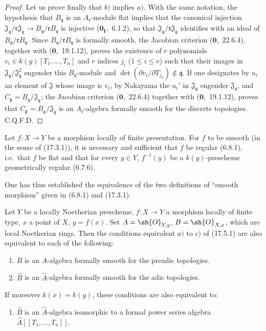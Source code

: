 \begin{proof}
Let us prove finally that $b)$ implies $a)$.
With the same notation, the hypothesis that $B_\mathfrak{q}$ is an $A_\mathfrak{r}$-module flat implies that the canonical injection $\mathfrak{J}_\mathfrak{q}/\mathfrak{r}\mathfrak{J}_\mathfrak{q}\to B_\mathfrak{q}/\mathfrak{r} B_\mathfrak{q}$ is injective ($\mathbf{0}_\mathbf{I}$,~6.1.2), so that $\mathfrak{J}_\mathfrak{q}/\mathfrak{r}\mathfrak{J}_\mathfrak{q}$ identifies with an ideal of $B_\mathfrak{q}/\mathfrak{r} B_\mathfrak{q}$.
Since $B_\mathfrak{q}/\mathfrak{r} B_\mathfrak{q}$ is formally smooth, the Jacobian criterion ($\mathbf{0}$,~22.6.4), together with ($\mathbf{0}$,~19.1.12), proves the existence of $r$ polynomials $v_i\in k(y)[T_1,\ldots,T_n]$ and $r$ indices $j_i$ ($1\leqslant i\leqslant r$) such that their images in $\mathfrak{J}_\mathfrak{q}/\mathfrak{J}_\mathfrak{q}^2$ engender this $B_\mathfrak{q}$-module and $\det(\partial v_i/\partial T_{j_k})\notin\mathfrak{q}$.
If one designates by $u_i$ an element of $\mathfrak{J}$ whose image is $v_i$, by Nakayama the $u_i'$ in $\mathfrak{J}_\mathfrak{q}$ engender $\mathfrak{J}_\mathfrak{q}$, and $C_\mathfrak{p}=B_\mathfrak{q}/\mathfrak{J}_\mathfrak{q}$; the Jacobian criterion ($\mathbf{0}$,~22.6.4) together with ($\mathbf{0}$,~19.1.12), proves that $C_\mathfrak{p}=B_\mathfrak{q}/\mathfrak{J}_\mathfrak{q}$ is an $A_\mathfrak{r}$-algebra formally smooth for the discrete topologies.
C.Q.F.D.
\end{proof}

\begin{corollary}[17.5.2]
\label{IV.17.5.2}
Let $f:X\to Y$ be a morphism locally of finite presentation.
For $f$ to be smooth (in the sense of (17.3.1)), it is necessary and sufficient that $f$ be regular (6.8.1), i.e.\ that $f$ be flat and that for every $y\in Y$, $f^{-1}(y)$ be a $k(y)$-prescheme geometrically regular (6.7.6).
\end{corollary}

One has thus established the equivalence of the two definitions of ``smooth morphism'' given in (6.8.1) and (17.3.1).

\begin{proposition}[17.5.3]
\label{IV.17.5.3}
Let $Y$ be a locally Noetherian prescheme, $f:X\to Y$ a morphism locally of finite type, $x$ a point of $X$, $y=f(x)$.
Set $A=\sh{O}_{Y,y}$, $B=\sh{O}_{X,x}$, which are local Noetherian rings.
Then the conditions equivalent $a)$ to $c)$ of (17.5.1) are also equivalent to each of the following:
\begin{enumerate}
  \item[d)] $B$ is an $A$-algebra formally smooth for the preadic topologies.
  \item[d')] $\hat{B}$ is an $\hat{A}$-algebra formally smooth for the adic topologies.
\end{enumerate}
If moreover $k(x)=k(y)$, these conditions are also equivalent to:
\begin{enumerate}
  \item[d'')] $\hat{B}$ is an $\hat{A}$-algebra isomorphic to a formal power series algebra $\hat{A}[[T_1,\ldots,T_n]]$.
\end{enumerate}
\end{proposition}

